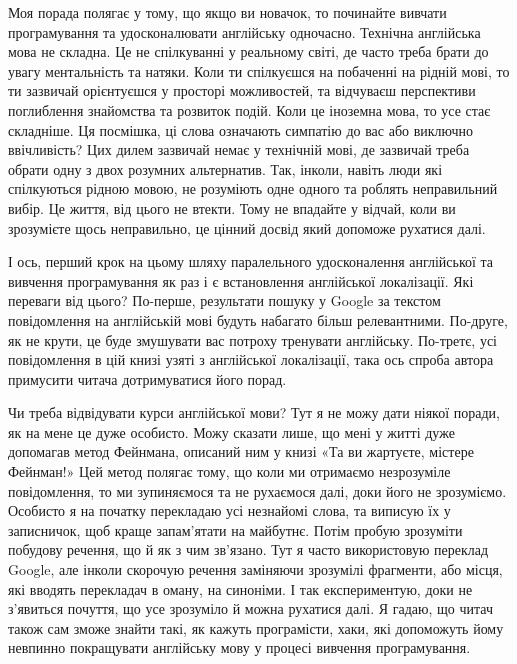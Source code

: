 Моя порада полягає у тому, що якщо ви новачок, то починайте вивчати програмування та удосконалювати англійську одночасно.
Технічна англійська мова не складна.
Це не спілкуванні у реальному світі, де часто треба брати до увагу ментальність та натяки.
Коли ти спілкуєшся на побаченні на рідній мові, то ти зазвичай орієнтуєшся у просторі можливостей, та відчуваєш перспективи поглиблення знайомства та розвиток подій.
Коли це іноземна мова, то усе стає складніше.
Ця посмішка, ці слова означають симпатію до вас або виключно ввічливість?
Цих дилем зазвичай немає у технічній мові, де зазвичай треба обрати одну з двох розумних альтернатив.
Так, інколи, навіть люди які спілкуються рідною мовою, не розуміють одне одного та роблять неправильний вибір.
Це життя, від цього не втекти.
Тому не впадайте у відчай, коли ви зрозумієте щось неправильно, це цінний досвід який допоможе рухатися далі.

І ось, перший крок на цьому шляху паралельного удосконалення англійської та вивчення програмування як раз і є встановлення англійської локалізації.
Які переваги від цього?
По-перше, результати пошуку у Google за текстом повідомлення на англійській мові будуть набагато більш релевантними.
По-друге, як не крути, це буде змушувати вас потроху тренувати англійську.
По-третє, усі повідомлення в цій книзі узяті з англійської локалізації, така ось спроба автора примусити читача дотримуватися його порад.

Чи треба відвідувати курси англійської мови?
Тут я не можу дати ніякої поради, як на мене це дуже особисто.
Можу сказати лише, що мені у житті дуже допомагав метод Фейнмана, описаний ним у книзі «Та ви жартуєте, містере Фейнман!»
Цей метод полягає тому, що коли ми отримаємо незрозуміле повідомлення, то ми зупиняємося та не рухаємося далі, доки його не зрозуміємо.
Особисто я на початку перекладаю усі незнайомі слова, та виписую їх у записничок, щоб краще запам'ятати на майбутнє.
Потім пробую зрозуміти побудову речення, що й як з чим зв'язано.
Тут я часто використовую переклад Google, але інколи скорочую речення заміняючи зрозумілі фрагменти, або місця, які вводять перекладач в оману, на синоніми.
І так експериментую, доки не з'явиться почуття, що усе зрозуміло й можна рухатися далі.
Я гадаю, що читач також сам зможе знайти такі, як кажуть програмісти, хаки, які допоможуть йому невпинно покращувати англійську мову у процесі вивчення програмування.
